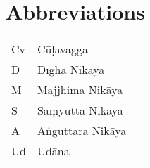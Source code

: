 \chapter{Abbreviations}

\begin{tabular}{l l}
Cv & Cūḷavagga\\
D & Dīgha Nikāya\\
M & Majjhima Nikāya\\
S & Saṃyutta Nikāya\\
A & Aṅguttara Nikāya\\
Ud & Udāna\\
\end{tabular}
